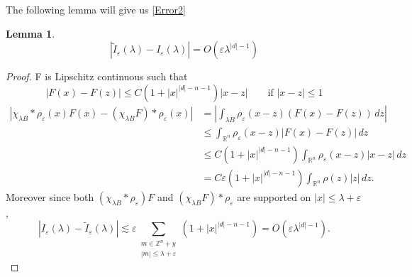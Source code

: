 \documentclass[10pt]{amsart}
\renewcommand{\epsilon}{\varepsilon}
\newtheorem{lemma}[theorem]{Lemma}
\renewcommand{\epsilon}{\varepsilon}
\newcommand{\R}{{\mathbb R}}
\newcommand{\1}{\mathbb{1}}
\newcommand{\Z}{{\mathbb Z}}
\begin{document}
The following lemma will give us \eqref{Error2}

\begin{lemma}\label{commutator}
\[
|\tilde{I}_{\epsilon} (\lambda) -I_{\epsilon} (\lambda)| = O(\epsilon\lambda^{|d|-1})
\]
\end{lemma}
\begin{proof}
    F is Lipschitz continuous such that
    \[
        |F(x) - F(z)| \leq C(1 + |x|^{|d|-n-1}) |x - z| \qquad \text{if $|x - z| \leq 1$}
    \]
    \begin{align*}
        |\chi_{\lambda B} *\rho_\epsilon(x) F(x) - (\chi_{\lambda B} F) * \rho_\epsilon(x)| &= \left| \int_{\lambda B} \rho_\epsilon(x - z) (F(x) - F(z)) \, dz \right| \\
        &\leq \int_{\R^n} \rho_\epsilon(x - z) |F(x) - F(z)| \, dz \\
        &\leq C(1 + |x|^{|d|-n-1})\int_{\R^n} \rho_\epsilon(x - z) |x - z| \, dz\\
        &= C \epsilon (1 + |x|^{|d|-n-1}) \int_{\R^n} \rho(z) |z| \, dz.
    \end{align*}
    Moreover since both $(\chi_{\lambda B} * \rho_\epsilon) F$ and $(\chi_{\lambda B} F) *\rho_\epsilon$ are supported on $|x| \leq \lambda + \epsilon$,
    \[
        |I_\epsilon(\lambda) - \tilde I_\epsilon(\lambda)| \lesssim \epsilon \sum_{\substack{m \in \Z^n + y \\ |m| \leq \lambda + \epsilon}} (1 + |x|^{|d|-n-1}) = O(\epsilon \lambda^{|d|-1}).
    \]
\end{proof}
\end{document}
